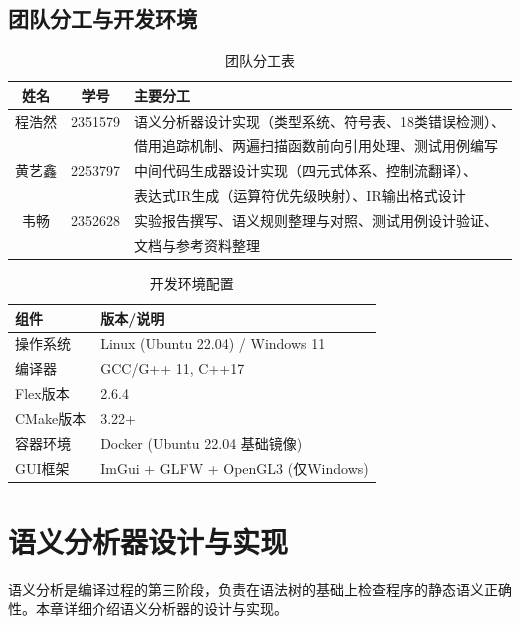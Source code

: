 \documentclass[12pt,a4paper]{ctexart}
\begin{document}
\subsection{团队分工与开发环境}

\begin{table}[H]
\centering
\caption{团队分工表}
\begin{tabular}{|c|c|l|}
\hline
\textbf{姓名} & \textbf{学号} & \textbf{主要分工} \\
\hline
程浩然 & 2351579 & 语义分析器设计实现（类型系统、符号表、18类错误检测）、\\
 & & 借用追踪机制、两遍扫描函数前向引用处理、测试用例编写 \\
\hline
黄艺鑫 & 2253797 & 中间代码生成器设计实现（四元式体系、控制流翻译）、\\
 & & 表达式IR生成（运算符优先级映射）、IR输出格式设计 \\
\hline
韦畅 & 2352628 & 实验报告撰写、语义规则整理与对照、测试用例设计验证、\\
 & & 文档与参考资料整理 \\
\hline
\end{tabular}
\end{table}

\begin{table}[H]
\centering
\caption{开发环境配置}
\begin{tabular}{|l|l|}
\hline
\textbf{组件} & \textbf{版本/说明} \\
\hline
操作系统 & Linux (Ubuntu 22.04) / Windows 11 \\
\hline
编译器 & GCC/G++ 11, C++17 \\
\hline
Flex版本 & 2.6.4 \\
\hline
CMake版本 & 3.22+ \\
\hline
容器环境 & Docker (Ubuntu 22.04 基础镜像) \\
\hline
GUI框架 & ImGui + GLFW + OpenGL3 (仅Windows) \\
\hline
\end{tabular}
\end{table}

\newpage

\section{语义分析器设计与实现}

语义分析是编译过程的第三阶段，负责在语法树的基础上检查程序的静态语义正确性。本章详细介绍语义分析器的设计与实现。
\end{document}

